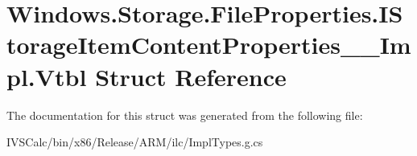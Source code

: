 \hypertarget{struct_windows_1_1_storage_1_1_file_properties_1_1_i_storage_item_content_properties_____impl_1_1_vtbl}{}\section{Windows.\+Storage.\+File\+Properties.\+I\+Storage\+Item\+Content\+Properties\+\_\+\+\_\+\+Impl.\+Vtbl Struct Reference}
\label{struct_windows_1_1_storage_1_1_file_properties_1_1_i_storage_item_content_properties_____impl_1_1_vtbl}


The documentation for this struct was generated from the following file\+:\begin{DoxyCompactItemize}
\item 
I\+V\+S\+Calc/bin/x86/\+Release/\+A\+R\+M/ilc/Impl\+Types.\+g.\+cs\end{DoxyCompactItemize}
